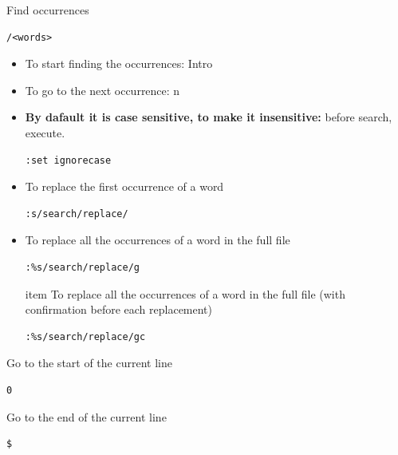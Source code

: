 \documentclass{article}
\newenvironment{codetemplate}[1][]{%
  \mybasecolorbox[#1]
  \itshape
}{%
  \endmybasecolorbox
}
\begin{document}
Find occurrences
\begin{codetemplate}
\begin{verbatim}
/<words>
\end{verbatim}
\end{codetemplate}
\begin{itemize}
    \item To start finding the occurrences: Intro
    \item To go to the next occurrence: n
    \item \textbf{By dafault it is case sensitive, to make it insensitive:} before search, execute.
\begin{codetemplate}
\begin{verbatim}
:set ignorecase
\end{verbatim}
\end{codetemplate}
    \item To replace the first occurrence of a word
\begin{codetemplate}
\begin{verbatim}
:s/search/replace/
\end{verbatim}
\end{codetemplate}
    \item To replace all the occurrences of a word in the full file
\begin{codetemplate}
\begin{verbatim}
:%s/search/replace/g
\end{verbatim}
\end{codetemplate}
    item To replace all the occurrences of a word in the full file (with confirmation before each replacement)
\begin{codetemplate}
\begin{verbatim}
:%s/search/replace/gc
\end{verbatim}
\end{codetemplate}
\end{itemize}

Go to the start of the current line
\begin{codetemplate}
\begin{verbatim}
0
\end{verbatim}
\end{codetemplate}

Go to the end of the current line
\begin{codetemplate}
\begin{verbatim}
$
\end{verbatim}
\end{codetemplate}
\end{document}
